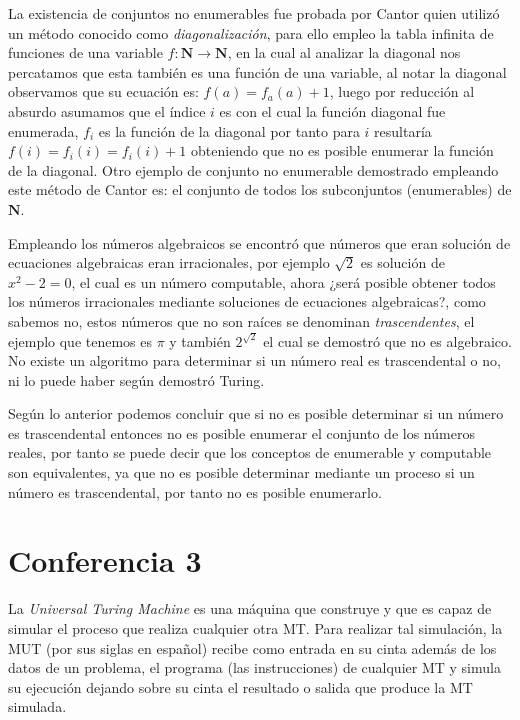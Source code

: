 \documentclass[]{article}
\begin{document}
La existencia de conjuntos no enumerables fue probada por Cantor quien utiliz\'o un m\'etodo conocido como \textit{diagonalizaci\'on}, para ello empleo la tabla infinita de funciones de una variable $f: \textbf{N} \rightarrow \textbf{N}$, en la cual al analizar la diagonal nos percatamos que esta tambi\'en es una funci\'on de una variable, al notar la diagonal observamos que su ecuaci\'on es: $f(a) = f_a(a) + 1$, luego por reducci\'on al absurdo asumamos que el \'indice $i$ es con el cual la funci\'on diagonal fue enumerada, $f_i$ es la funci\'on de la diagonal por tanto para $i$ resultar\'ia $f(i) = f_i(i) = f_i(i) + 1$ obteniendo que no es posible enumerar la funci\'on de la diagonal. Otro ejemplo de conjunto no enumerable demostrado empleando este m\'etodo de Cantor es: el conjunto de todos los subconjuntos (enumerables) de $\textbf{N}$.

Empleando los n\'umeros algebraicos se encontr\'o que n\'umeros que eran soluci\'on de ecuaciones algebraicas eran irracionales, por ejemplo $\sqrt{2}$ es soluci\'on de $x^2 - 2 = 0$, el cual es un n\'umero computable, ahora ¿ser\'a posible obtener todos los n\'umeros irracionales mediante soluciones de ecuaciones algebraicas?, como sabemos no, estos n\'umeros que no son ra\'ices se denominan \textit{trascendentes}, el ejemplo que tenemos es $\pi$ y tambi\'en $2^{\sqrt{2}}$ el cual se demostr\'o que no es algebraico. No existe un algoritmo para determinar si un n\'umero real es trascendental o no, ni lo puede haber seg\'un demostr\'o Turing.

Seg\'un lo anterior podemos concluir que si no es posible determinar si un n\'umero es trascendental entonces no es posible enumerar el conjunto de los n\'umeros reales, por tanto se puede decir que los conceptos de enumerable y computable son equivalentes, ya que no es posible determinar mediante un proceso si un n\'umero es trascendental, por tanto no es posible enumerarlo.


\section*{Conferencia 3}

La \textit{Universal Turing Machine} es una m\'aquina que construye y que es capaz de simular el proceso que realiza cualquier otra MT. Para realizar tal simulaci\'on, la MUT (por sus siglas en espa\~nol) recibe como entrada en su cinta adem\'as de los datos de un problema, el programa (las 
instrucciones) de cualquier MT y simula su ejecuci\'on dejando sobre su cinta el resultado o salida que produce la MT simulada.
\end{document}
